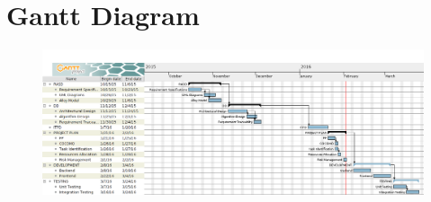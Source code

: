 \section{Gantt Diagram}

\begin{figure}[H]
	\centering
	\includegraphics[angle=90,scale=0.4]{Tasks/gantt}
	\label{gantt}
\end{figure}

